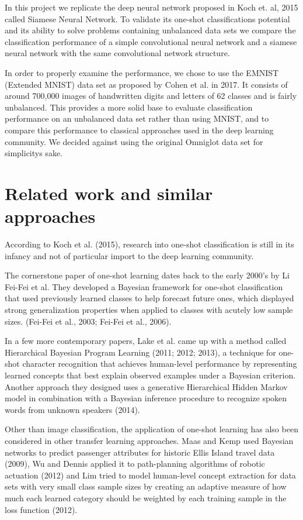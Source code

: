 \documentclass[a4paper,pt12]{article}
\begin{document}
In this project we replicate the deep neural network proposed in Koch et. al, 2015 called Siamese Neural Network. To validate its one-shot classifications potential and its ability to solve problems containing unbalanced data sets we compare the classification performance of a simple convolutional neural network and a siamese neural network with the same convolutional network structure.

In order to properly examine the performance, we chose to use the EMNIST (Extended MNIST) data set as proposed by Cohen et al. in 2017. It consists of around 700,000 images of handwritten digits and letters of 62 classes and is fairly unbalanced. This provides a more solid base to evaluate classification performance on an unbalanced data set rather than using MNIST, and to compare this performance to classical approaches used in the deep learning community. We decided against using the original Omniglot data set for simplicitys sake.

\section{Related work and similar approaches}
According to Koch et al. (2015), research into one-shot classification is still in its infancy and not of particular import to the deep learning community.

The cornerstone paper of one-shot learning dates back to the early 2000's by Li Fei-Fei et al. They developed a Bayesian framework for one-shot classification that used previously learned classes to help forecast future ones, which displayed strong generalization properties when applied to classes with acutely low sample sizes. (Fei-Fei et al., 2003; Fei-Fei et al., 2006).

In a few more contemporary papers, Lake et al. came up with a method called Hierarchical Bayesian Program Learning (2011; 2012; 2013), a technique for one-shot character recognition that achieves human-level performance by representing learned concepts that best explain observed examples under a Bayesian criterion. Another approach they designed uses a generative Hierarchical Hidden Markov model in combination with a Bayesian inference procedure to recognize spoken words from unknown speakers (2014).

Other than image classification, the application of one-shot learning has also been considered in other transfer learning approaches. Maas and Kemp used Bayesian networks to predict passenger attributes for historic Ellis Island travel data (2009), Wu and Dennis applied it to path-planning algorithms of robotic actuation (2012) and Lim tried to model human-level concept extraction for data sets with very small class sample sizes by creating an adaptive measure of how much each learned category should be weighted by each training sample in the loss function (2012).
\end{document}
